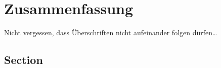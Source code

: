 \chapter{Zusammenfassung} \label{cha:Zusammenfassung}

Nicht vergessen, dass Überschriften nicht aufeinander folgen dürfen\ldots


\section{Section}
